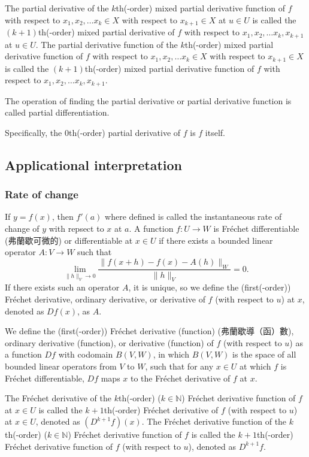 The partial derivative of the $k$th(-order) mixed partial derivative function of $f$ with respect to $ x_1, x_2,\dots  x_k\in X$ with respect to $ x_{k+1}\in X$ at $u\in U$ is called the $(k+1)$th(-order) mixed partial derivative of $f$ with respect to $ x_1, x_2,\dots  x_k, x_{k+1}$ at $u\in U$. The partial derivative function of the $k$th(-order) mixed partial derivative function of $f$ with respect to $ x_1, x_2,\dots  x_k\in X$ with respect to $ x_{k+1}\in X$ is called the $(k+1)$th(-order) mixed partial derivative function of $f$ with respect to $ x_1, x_2,\dots  x_k, x_{k+1}$.

The operation of finding the partial derivative or partial derivative function is called partial differentiation.

Specifically, the $0$th(-order) partial derivative of $f$ is $f$ itself.
\subsection{Applicational interpretation}
\subsubsection{Rate of change}
If $y=f(x)$, then $f'(a)$ where defined is called the instantaneous rate of change of $y$ with repsect to $x$ at $a$.
A function $f\colon U\to W$ is Fréchet differentiable (弗蘭歇可微的) or differentiable at $x\in U$ if there exists a bounded linear operator $A\colon V\to W$ such that
\[\lim_{\|h\|_V\to 0}\frac{\|f(x+h)-f(x)-A(h)\|_W}{\|h\|_V}=0.\]
If there exists such an operator $A$, it is unique, so we define the (first(-order)) Fréchet derivative, ordinary derivative, or derivative of $f$ (with respect to $u$) at $x$, denoted as $Df(x)$, as $A$.

We define the (first(-order)) Fréchet derivative (function) (弗蘭歇導（函）數), ordinary derivative (function), or derivative (function) of $f$ (with respect to $u$) as a function $Df$ with codomain $B(V,W)$, in which $B(V,W)$ is the space of all bounded linear operators from $V$ to $W$, such that for any $x\in U$ at which $f$ is Fréchet differentiable, $Df$ maps $x$ to the Fréchet derivative of $f$ at $x$.

The Fréchet derivative of the $k$th(-order) ($k\in\mathbb{N}$) Fréchet derivative function of $f$ at $x\in U$ is called the $k+1$th(-order) Fréchet derivative of $f$ (with respect to $u$) at $x\in U$, denoted as $(D^{k+1}f)(x)$. The Fréchet derivative function of the $k$th(-order) ($k\in\mathbb{N}$) Fréchet derivative function of $f$ is called the $k+1$th(-order) Fréchet derivative function of $f$ (with respect to $u$), denoted as $D^{k+1}f$.


